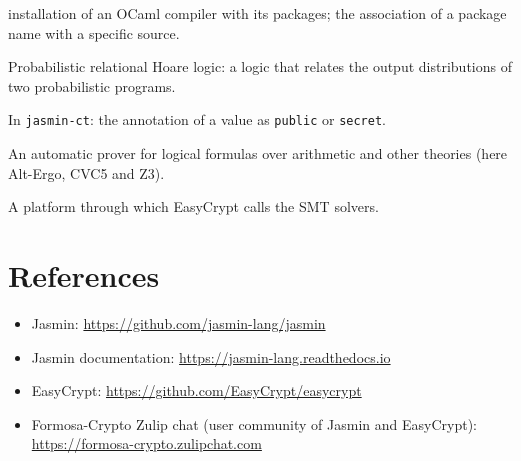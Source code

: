 \documentclass[11pt,a4paper]{article}
\begin{document}
\begin{small}
\begin{description}[leftmargin=0pt,itemsep=2pt]
        installation of an OCaml compiler with its packages; the association
        of a package name with a specific source.
  \item[pRHL] Probabilistic relational Hoare logic: a logic that relates the
        output distributions of two probabilistic programs.
  \item[Security type] In \texttt{jasmin-ct}: the annotation of a value as
        \texttt{public} or \texttt{secret}.
  \item[SMT solver] An automatic prover for logical formulas over arithmetic
        and other theories (here Alt-Ergo, CVC5 and Z3).
  \item[Why3] A platform through which EasyCrypt calls the SMT solvers.
\end{description}
\end{small}

\section{References}

\begin{itemize}[leftmargin=*]
  \item Jasmin: \url{https://github.com/jasmin-lang/jasmin}
  \item Jasmin documentation: \url{https://jasmin-lang.readthedocs.io}
  \item EasyCrypt: \url{https://github.com/EasyCrypt/easycrypt}
  \item Formosa-Crypto Zulip chat (user community of Jasmin and EasyCrypt):\\
        \url{https://formosa-crypto.zulipchat.com}
\end{itemize}
\end{document}
